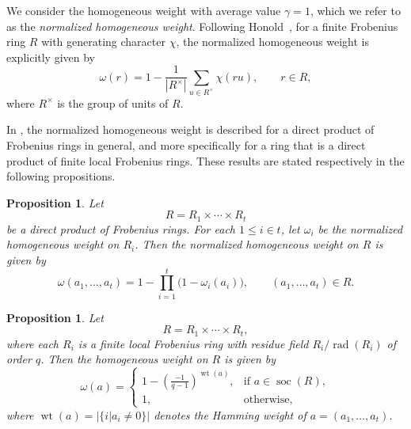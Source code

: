 \documentclass[11pt,reqno]{amsart}
\theoremstyle{plain}
\newtheorem{prop}[thm]{Proposition}
\theoremstyle{remark}
\theoremstyle{definition}
\newcommand{\soc}{\mathop{\mathrm{soc}}\nolimits}
\newcommand{\rad}{\mathop{\mathrm{rad}}\nolimits}
\begin{document}

We consider the homogeneous weight with
average value $\gamma = 1$, which we refer to as the
\emph{normalized homogeneous weight}. Following Honold~\cite[p.~412]{Hon-Thom2001},
for a finite Frobenius ring $R$ with generating character $\chi$, the
normalized homogeneous weight is explicitly given by
\begin{equation}\label{NorHomWeight}
	\omega(r)
	=
	1 - \frac{1}{|R^\times|} \sum_{u \in R^\times} \chi(ru),
	\qquad r \in R,
\end{equation}
where $R^\times$ is the group of units of $R$.

In \cite{Gluesing-Luerssen2016}, the normalized homogeneous weight
is described for a direct product of Frobenius rings in general, and
more specifically for a ring that is a direct product of finite local
Frobenius rings. These results are stated respectively in the following
propositions.

\begin{prop}\label{WeightDirectFrobenius} \cite[Proposition~3.7]{Gluesing-Luerssen2016}
Let
\[
R = R_1 \times \cdots \times R_t
\]
be a direct product of Frobenius rings.
For each $1\leq i \in t$, let $\omega_i$ be the normalized homogeneous
weight on $R_i$. Then the normalized homogeneous weight on $R$ is
given by
\[
\omega(a_1,\dots,a_t)
=
1 - \prod_{i=1}^t \bigl(1 - \omega_i(a_i)\bigr),
\qquad
(a_1,\dots,a_t) \in R.
\]
\end{prop}

\begin{prop}\label{WeightDirectFrobeniusLocal} \cite[Proposition~3.8]{Gluesing-Luerssen2016}
Let
\[
R = R_1 \times \cdots \times R_t,
\]
where each $R_i$ is a finite local Frobenius ring with residue field
$R_i/\rad(R_i)$ of order $q$. Then the homogeneous weight
on $R$ is given by
\[
\omega(a)
=
\begin{cases}
\displaystyle
1 - \left(\frac{-1}{q-1}\right)^{\operatorname{wt}(a)},
& \text{if } a \in \soc(R), \\[1.2ex]
1, & \text{otherwise},
\end{cases}
\]
where $\operatorname{wt}(a)=|\{i | a_i \neq 0\}|$ denotes the Hamming weight of $a = (a_1,\dots,a_t)$.
\end{prop}
\end{document}
